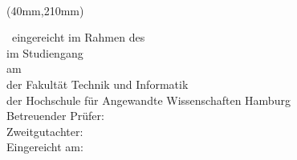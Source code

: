 %
%
\newpage
\thispagestyle{empty}
{\selectfont

  \vspace*{1cm}
  \begin{minipage}[b]{\textwidth}
    \fontsize{14pt}{20pt}
    \selectfont
    \begin{center}
      \IthesisAuthor \\
			\IthesisAuthorSecond
    \end{center}
  \end{minipage}

  \vspace{1.5cm}
  \begin{minipage}[b][0cm][b]{\textwidth}
    \fontsize{18pt}{20pt}
    \selectfont
    \begin{center}
      \IthesisTitle  	  
  	\end{center}
  \end{minipage}

  \begin{textblock*}{\textwidth}(40mm,210mm)
    \begin{minipage}[b]{\textwidth}
      \selectfont
      \fontsize{12pt}{14pt}
      \selectfont
      \IthesisKindDE ~eingereicht im Rahmen des \IthesisExaminationDE \\

      im Studiengang \IstudyCourseName \\
      am \IthesisDepartmentFull \\
      der Fakultät Technik und Informatik\\
      der Hochschule für Angewandte Wissenschaften Hamburg\\

      Betreuender Prüfer: \IfirstSv \\
      Zweitgutachter: \IsecondSv \\

      Eingereicht am: \ISubDate \\
    \end{minipage}
  \end{textblock*}
}
